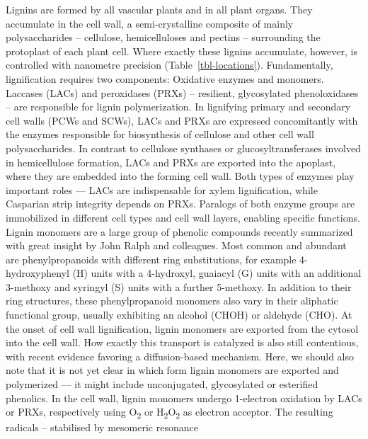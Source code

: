 \documentclass[journal=,manuscript=]{achemso}
\begin{document}
Lignins are formed by all vascular plants and in all plant organs. They
accumulate in the cell wall, a semi-crystalline composite of mainly
polysaccharides -- cellulose, hemicelluloses and pectins -- surrounding
the protoplast of each plant cell.\citep{Pedersen2023} Where exactly
these lignins accumulate, however, is controlled with nanometre
precision (Table~\ref{tbl-locations}). Fundamentally, lignification
requires two components: Oxidative enzymes and monomers. Laccases (LACs)
and peroxidases (PRXs) -- resilient, glycosylated phenoloxidases -- are
responsible for lignin polymerization.\citep{Blaschek2021} In lignifying
primary and secondary cell walls (PCWs and SCWs), LACs and PRXs are
expressed concomitantly with the enzymes responsible for biosynthesis of
cellulose and other cell wall polysaccharides.\citep{Blaschek2023} In
contrast to cellulose synthases or glucosyltransferases involved in
hemicellulose formation, LACs and PRXs are exported into the apoplast,
where they are embedded into the forming cell wall. Both types of
enzymes play important roles --- LACs are indispensable for xylem
lignification, while Casparian strip integrity depends on
PRXs.\citep{Blaschek2021, Blaschek2023, Rojas-Murcia2020} Paralogs of
both enzyme groups are immobilized in different cell types and cell wall
layers, enabling specific functions.\citep{Hoffmann2020, Blaschek2023}
Lignin monomers are a large group of phenolic compounds recently
summarized with great insight by John Ralph and
colleagues.\citep{Ralph2023} Most common and abundant are
phenylpropanoids with different ring substitutions, for example
4-hydroxyphenyl (H) units with a 4-hydroxyl, guaiacyl (G) units with an
additional 3-methoxy and syringyl (S) units with a further 5-methoxy. In
addition to their ring structures, these phenylpropanoid monomers also
vary in their aliphatic functional group, usually exhibiting an alcohol
(CHOH) or aldehyde (CHO). At the onset of cell wall lignification,
lignin monomers are exported from the cytosol into the cell wall. How
exactly this transport is catalyzed is also still contentious, with
recent evidence favoring a diffusion-based mechanism.\citep{Perkins2022}
Here, we should also note that it is not yet clear in which form lignin
monomers are exported and polymerized --- it might include unconjugated,
glycosylated or esterified phenolics. In the cell wall, lignin monomers
undergo 1-electron oxidation by LACs or PRXs, respectively using
O\textsubscript{2} or H\textsubscript{2}O\textsubscript{2} as electron
acceptor. The resulting radicals -- stabilised by mesomeric resonance
\end{document}
